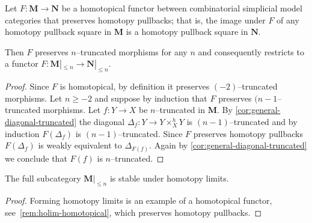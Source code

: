 \begin{proposition}\label{prop:truncated-objects-exact-functors}
  Let \(F\colon \mathbf{M}\to\mathbf{N}\) be a homotopical functor
  between combinatorial simplicial model categories that preserves
  homotopy pullbacks; that is, the image under \(F\) of any homotopy
  pullback square in \(\mathbf M\) is a homotopy pullback square in
  \(\mathbf N\).

  Then \(F\) preserves \(n\)--truncated morphisms for any \(n\) and
  consequently restricts to a functor
  \(F\colon \mathbf M|_{\leq n}\to\mathbf N|_{\leq n}\).
\end{proposition}
\begin{proof}
  Since \(F\) is homotopical, by definition it preserves
  \((-2)\)--truncated morphisms. Let \(n\geq -2\) and suppose by
  induction that \(F\) preserves \((n-1\)--truncated morphisms. Let
  \(f\colon Y\to X\) be \(n\)--truncated in \(\mathbf M\). By
  \autoref{cor:general-diagonal-truncated} the diagonal
  \(\Delta_{f}\colon Y\to Y\times^{h}_{X} Y\) is \((n-1)\)--truncated
  and by induction \(F(\Delta_{f})\) is \((n-1)\)--truncated. Since
  \(F\) preserves homotopy pullbacks \(F(\Delta_{f})\) is weakly
  equivalent to \(\Delta_{F(f)}\). Again by
  \autoref{cor:general-diagonal-truncated} we conclude that \(F(f)\)
  is \(n\)--truncated.
\end{proof}

\begin{corollary}\label{cor:truncated-objects-limits}
  The full subcategory \(\mathbf{M}|_{{\leq} n}\) is stable under
  homotopy limits.
\end{corollary}
\begin{proof}
  Forming homotopy limits is an example of a homotopical functor, see~\autoref{rem:holim-homotopical}, which preserves homotopy pullbacks.
\end{proof}

